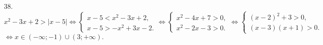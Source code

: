 38. $x^2-3x+2>|x-5|\Leftrightarrow \begin{cases}x-5<x^2-3x+2,\\ x-5>-x^2+3x-2.\end{cases}
\Leftrightarrow \begin{cases}x^2-4x+7>0,\\ x^2-2x-3>0.\end{cases}
\Leftrightarrow \begin{cases}(x-2)^2+3>0,\\ (x-3)(x+1)>0.\end{cases}$\\$\Leftrightarrow x\in (-\infty;-1)\cup(3;+\infty).$\\
